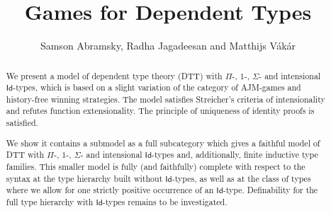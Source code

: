 \documentclass[runningheads,a4paper]{llncs}
\begin{document}
\mainmatter  

\title{Games for Dependent Types}

\author{Samson Abramsky, Radha Jagadeesan and Matthijs V\'ak\'ar}





\maketitle

\vspace{-20pt}
\begin{abstract}
We present a model of dependent type theory (\textsf{DTT}) with $\Pi$-, $1$-, $\Sigma$- and intensional $\mathsf{Id}$-types, which is based on a slight variation of the category of AJM-games and history-free winning strategies. The model satisfies Streicher's criteria of intensionality and refutes function extensionality. The principle of uniqueness of identity proofs is satisfied.

We show it contains a submodel as a full subcategory which gives a faithful model of \textsf{DTT} with $\Pi$-, $1$-, $\Sigma$- and intensional $\mathsf{Id}$-types and, additionally, finite inductive type families. This smaller model is fully (and faithfully) complete with respect to the syntax   at the type hierarchy built without $\mathsf{Id}$-types, as well as at the class of types where we allow for one strictly positive occurrence of an $\mathsf{Id}$-type. Definability for the full type hierarchy with $\mathsf{Id}$-types remains to be investigated.
\end{abstract}
\vspace{-25pt}
\end{document}
